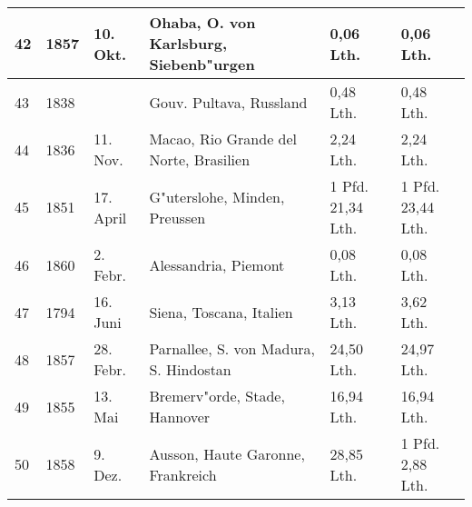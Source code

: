 \documentclass[a4paper, 11pt, oneside]{article}
\begin{document}
\begin{center}
\begin{footnotesize}
\begin{tabular}{ |p{7mm}|p{7mm}|p{13mm}|p{48mm}|p{22mm}|p{22mm}| }
    42 & 1857 & 10. Okt. & Ohaba, O. von Karlsburg, Siebenb"urgen & 0,06 Lth. & 0,06 Lth.\\\hline
    43 & 1838 &  & Gouv. Pultava, Russland & 0,48 Lth. & 0,48 Lth.\\\hline
    44 & 1836 & 11. Nov. & Macao, Rio Grande del Norte, Brasilien & 2,24 Lth. & 2,24 Lth.\\\hline
    45 & 1851 & 17. April & G"uterslohe, Minden, Preussen & 1 Pfd. 21,34 Lth. & 1 Pfd. 23,44 Lth.\\\hline
    46 & 1860 & 2. Febr. & Alessandria, Piemont & 0,08 Lth. & 0,08 Lth.\\\hline
    47 & 1794 & 16. Juni & Siena, Toscana, Italien & 3,13 Lth. & 3,62 Lth.\\\hline
    48 & 1857 & 28. Febr. & Parnallee, S. von Madura, S. Hindostan & 24,50 Lth. & 24,97 Lth.\\\hline
    49 & 1855 & 13. Mai & Bremerv"orde, Stade, Hannover & 16,94 Lth. & 16,94 Lth.\\\hline
    50 & 1858 & 9. Dez. & Ausson, Haute Garonne, Frankreich & 28,85 Lth. & 1 Pfd. 2,88 Lth.\\
    \hline
\end{tabular}
\end{footnotesize}
\end{center}
\end{document}
